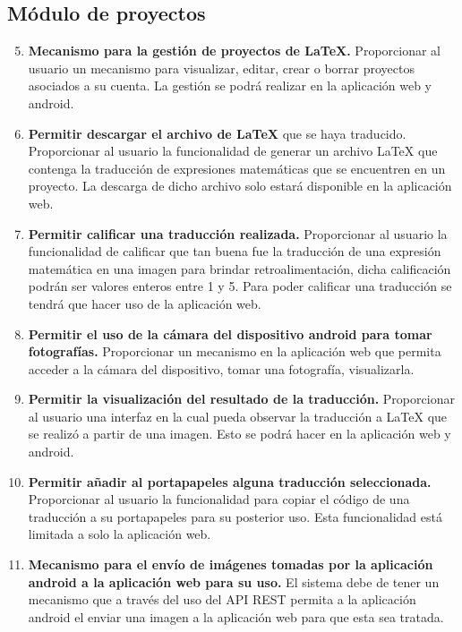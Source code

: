     \subsection{Módulo de proyectos}
    \begin{enumerate}[label=\textbf{RF\arabic*.}]
    	\setcounter{enumi}{4}
    	\item \textbf{Mecanismo para la gestión de proyectos de \LaTeX{}.} Proporcionar al usuario un mecanismo para visualizar, editar, crear o borrar proyectos asociados a su cuenta. La gestión se podrá realizar en la aplicación web y android.
    	\item \textbf{Permitir descargar el archivo de \LaTeX{}} que se haya traducido. Proporcionar al usuario la funcionalidad de generar un archivo \LaTeX{} que contenga la traducción de expresiones matemáticas que se encuentren en un proyecto. La descarga de dicho archivo solo estará disponible en la aplicación web.
    	\item \textbf{Permitir calificar una traducción realizada.} Proporcionar al usuario la funcionalidad de calificar que tan buena fue la traducción de una expresión matemática en una imagen para brindar retroalimentación, dicha calificación podrán ser valores enteros entre 1 y 5. Para poder calificar una traducción se tendrá que hacer uso de la aplicación web.
    	\item \textbf{Permitir el uso de la cámara del dispositivo android para tomar fotografías.} Proporcionar un mecanismo en la aplicación web que permita acceder a la cámara del dispositivo, tomar una fotografía, visualizarla.
    	\item \textbf{Permitir la visualización del resultado de la traducción.} Proporcionar al usuario una interfaz en la cual pueda observar la traducción a \LaTeX{} que se realizó a partir de una imagen. Esto se podrá hacer en la aplicación web y android.
    	\item \textbf{Permitir añadir al portapapeles alguna traducción seleccionada.} Proporcionar al usuario la funcionalidad para copiar el código de una traducción a su portapapeles para su posterior uso. Esta funcionalidad está limitada a solo la aplicación web.
    	\item \textbf{Mecanismo para el envío de imágenes tomadas por la aplicación android a la aplicación web para su uso.} El sistema debe de tener un mecanismo que a través del uso del API REST permita a la aplicación android el enviar una imagen a la aplicación web para que esta sea tratada. 
    \end{enumerate}
    
